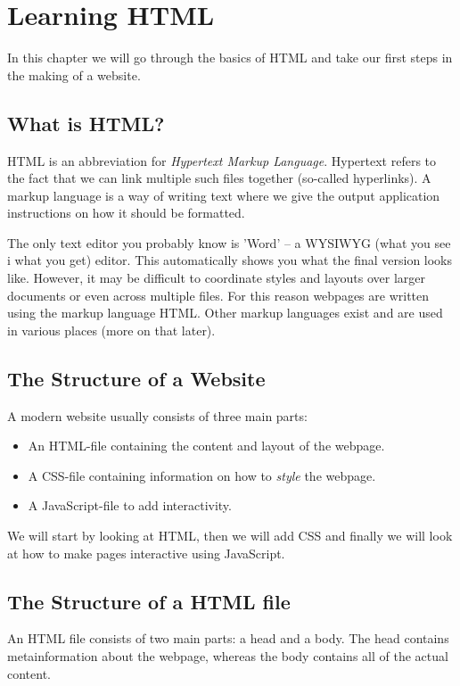 \documentclass[english,11pt,a4paper]{report}
\begin{document}
\section{Learning HTML}

In this chapter we will go through the basics of HTML and take our first steps in the making of a website.

\subsection{What is HTML?}

HTML is an abbreviation for \emph{Hypertext Markup Language}. Hypertext refers to the fact that we can link multiple such files together (so-called hyperlinks). A markup language is a way of writing text where we give the output application instructions on how it should be formatted. 

The only text editor you probably know is 'Word' -- a WYSIWYG (what you see i what you get) editor. This automatically shows you what the final version looks like. However, it may be difficult to coordinate styles and layouts over larger documents or even across multiple files. For this reason webpages are written using the markup language HTML. Other markup languages exist and are used in various places (more on that later).

\subsection{The Structure of a Website}
A modern website usually consists of three main parts: 
\begin{itemize}
    \item An HTML-file containing the content and layout of the webpage.
    \item A CSS-file containing information on how to \emph{style} the webpage.
    \item A JavaScript-file to add interactivity.
\end{itemize}

We will start by looking at HTML, then we will add CSS and finally we will look at how to make pages interactive using JavaScript. 

\subsection{The Structure of a HTML file}
An HTML file consists of two main parts: a head and a body. The head contains metainformation about the webpage, whereas the body contains all of the actual content.
\end{document}
